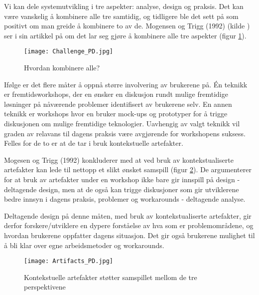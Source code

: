 \noindent
Vi kan dele systemutvikling i tre aspekter: analyse, design og praksis. Det kan være vanskelig å kombinere alle tre samtidig, og tidligere ble det sett på som positivt om man greide å kombinere to av de. Mogensen og Trigg (1992) (kilde \cite{Mogensen92}) ser i sin artikkel på om det lar seg gjøre å kombinere alle tre aspekter (figur \ref{Challenge_PD}).

\begin{figure}[H]
\centering
\texttt{[image: Challenge\_PD.jpg]}
\caption{Hvordan kombinere alle?}
\label{Challenge_PD}
\end{figure}

\noindent
Ifølge \cite{Mogensen92} er det flere måter å oppnå større involvering av brukerene på. Én teknikk er fremtidsworkshops, der en ønsker en diskusjon rundt mulige fremtidige løsninger på nåværende problemer identifisert av brukerene selv. En annen teknikk er workshops hvor en bruker mock-ups og prototyper for å trigge diskusjonen om mulige fremtidige teknologier.  Uavhengig av valgt teknikk vil graden av relavans til dagens praksis være avgjørende for workshopens suksess. Felles for de to er at de tar i bruk kontekstuelle artefakter.

\noindent
Mogesen og Trigg (1992) konkluderer med at ved bruk av kontekstualiserte artefakter kan lede til nettopp et slikt ønsket samspill (figur \ref{Artifacts_PD}). De argumenterer for at bruk av artefakter under en workshop ikke bare gir innspill på design - deltagende design, men at de også kan trigge diskusjoner som gir utviklerene bedre innsyn i dagens praksis, problemer og workarounds - deltagende analyse. 

\noindent
Deltagende design på denne måten, med bruk av kontekstualiserte artefakter, gir derfor forskere/utviklere en dypere forståelse av hva som er problemområdene, og hvordan brukerene oppfatter dagens situasjon. Det gir også brukerene mulighet til å bli klar over egne arbeidsmetoder og workarounds.

\begin{figure}[H]
\centering
\texttt{[image: Artifacts\_PD.jpg]}
\caption{Kontekstuelle artefakter støtter samspillet mellom de tre perspektivene}
\label{Artifacts_PD}
\end{figure}